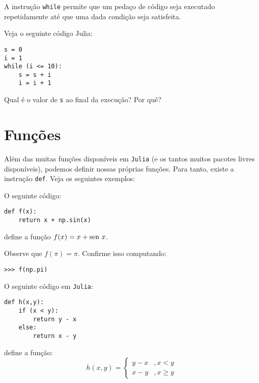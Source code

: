 A instrução \verb+while+ permite que um pedaço de código seja executado repetidamente até que uma dada condição seja satisfeita.

\begin{ex}
Veja o seguinte código Julia:
\begin{lstlisting}
s = 0
i = 1
while (i <= 10):
    s = s + i
    i = i + 1
\end{lstlisting}
Qual é o valor de \verb+s+ ao final da execução? Por quê?
\end{ex}

\section{Funções}

Além das muitas funções disponíveis em \verb+Julia+ (e os tantos muitos pacotes livres disponíveis), podemos definir nossas próprias funções. Para tanto, existe a instrução \verb+def+. Veja os seguintes exemplos:

\begin{ex}
  O seguinte código:
\begin{lstlisting}
def f(x):
    return x + np.sin(x)
\end{lstlisting}
define a função $f(x) = x + \operatorname{sen}\, x$.

Observe que $f(\pi) = \pi$. Confirme isso computando:
\begin{lstlisting}
>>> f(np.pi)
\end{lstlisting}
\end{ex}

\begin{ex}
  O seguinte código em \verb+Julia+:
\begin{lstlisting}
def h(x,y):
    if (x < y):
        return y - x
    else:
        return x - y
\end{lstlisting}
define a função:
\begin{equation}
  h(x,y) = \left\{
    \begin{array}{ll}
      y - x &, x < y\\
      x - y &, x \geq y
    \end{array}
\right.
\end{equation}
\end{ex}

